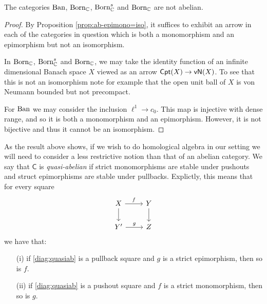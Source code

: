 \begin{corollary} The categories $\operatorname{Ban}$, $\operatorname{Born}_\mathbb C$, $\operatorname{Born}_\mathbb C^s$ and $\operatorname{Born}_\mathbb C$ 
are not abelian.
\end{corollary}
\begin{proof} By Proposition \ref{prop:ab-epimono=iso}, it suffices 
to exhibit an arrow in each of the categories in question which is both
a monomorphism and an epimorphism but not an isomorphism.

In $\operatorname{Born}_\mathbb C$, $\operatorname{Born}_\mathbb C^s$ and $\operatorname{Born}_\mathbb C$, 
we may take the identity function of an infinite dimensional
Banach space $X$ viewed as an arrow $\mathsf{Cpt}(X) \to \mathsf{vN}(X)$.
To see that this is not an isomorphism note
for example that the open unit ball of $X$ is von Neumann
bounded but not precompact.

For $\operatorname{Ban}$ we may consider the inclusion $\ell^1 \to c_0$. This map
is injective with dense range, and so it is both a monomorphism
and an epimorphism. However, 
it is not bijective and thus it cannot be an isomorphism.
\end{proof}

As the result above shows, if we wish
to do homological algebra in our setting 
we will need to consider a less restrictive
notion than that of an abelian category. 
We say that $\mathsf C$ is \emph{quasi-abelian}
if strict monomorphisms are stable under pushouts
and struct epimorphisms are stable under pullbacks.
Explictly, this means that for every square
\begin{equation}\label{diag:quasiab}
\begin{tikzcd}
X \arrow{r}{f} \arrow{d} & Y \arrow{d} \\
Y' \arrow{r}{g} & Z
\end{tikzcd}
\end{equation}
we have that:
\begin{itemize}
    \item[(i)] if \eqref{diag:quasiab} is a pullback square and $g$ is a strict epimorphism, then so is $f$.
    \item[(ii)] if \eqref{diag:quasiab} is a pushout square and $f$ is a strict monomorphism, then so is $g$.
\end{itemize}